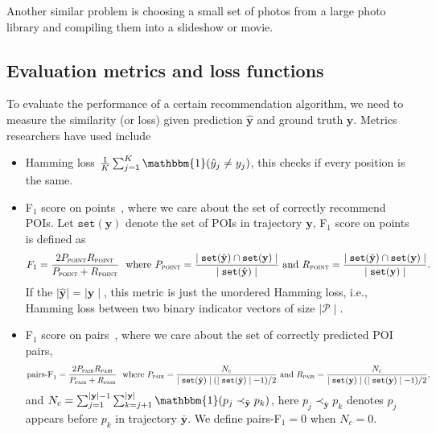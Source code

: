 Another similar problem is choosing a small set of photos from a large photo library and compiling them into a slideshow or movie.



\subsection{Evaluation metrics and loss functions}
\label{sec:evaluation}

To evaluate the performance of a certain recommendation algorithm,
we need to measure the similarity (or loss) given prediction $\hat{\mathbf{y}}$ and ground truth $\mathbf{y}$.
Metrics researchers have used include
\begin{itemize}
\item Hamming loss $\frac{1}{K} \sum_{j=1}^K \mathbbm{1}(\hat{y}_j \neq y_j)$, this checks if every position is the same.

\item F$_1$ score on points~\cite{ijcai15}, where we care about the set of correctly recommend POIs. 
      Let $\texttt{set}(\mathbf{y})$ denote the set of POIs in trajectory $\mathbf{y}$, F$_1$ score on points is defined as
\begin{equation*}
F_1 = \frac{2  P_{\textsc{point}}  R_{\textsc{point}}}{P_{\textsc{point}} + R_{\textsc{point}}} ~~\text{where}~
P_{\textsc{point}} = \frac{\mid \texttt{set}(\hat{\mathbf{y}}) \cap \texttt{set}(\mathbf{y}) \mid}{\mid \texttt{set}(\hat{\mathbf{y}}) \mid}~\text{and}~
R_{\textsc{point}} = \frac{\mid \texttt{set}(\hat{\mathbf{y}}) \cap \texttt{set}(\mathbf{y}) \mid}{\mid \texttt{set}(\mathbf{y}) \mid}.
\end{equation*}
If the $\mid\!\! \hat{\mathbf{y}} \!\!\mid = \mid\!\! \mathbf{y} \!\!\mid$, this metric is just the unordered Hamming loss, 
i.e., Hamming loss between two binary indicator vectors of size $\mid\!\! \mathcal{P} \!\!\mid$.


\item F$_1$ score on pairs~\cite{cikm16paper}, where we care about the set of correctly predicted POI pairs,
\begin{equation*}
\text{pairs-F}_1 = \frac{2 P_{\textsc{pair}} R_{\textsc{pair}}}{P_{\textsc{pair}} + R_{\textsc{pair}}}~~\text{where}~
P_{\textsc{pair}} = \frac{N_c} {\mid \texttt{set}(\hat{\mathbf{y}}) \mid (\mid \texttt{set}(\hat{\mathbf{y}}) \mid - 1) / 2}~\text{and}~
R_{\textsc{pair}} = \frac{N_c} {\mid \texttt{set}(\mathbf{y}) \mid (\mid \texttt{set}(\mathbf{y}) \mid - 1) / 2},
\end{equation*}
and $N_c = \sum_{j=1}^{\mid \mathbf{y} \mid - 1} \sum_{k=j+1}^{\mid \mathbf{y} \mid} \mathbbm{1}(p_j \prec_{\bar{\mathbf{y}}} p_k)$,
here $p_j \prec_{\bar{\mathbf{y}}} p_k$ denotes $p_j$ appears before $p_k$ in trajectory $\bar{\mathbf{y}}$.
We define pairs-F$_1 = 0$ when $N_c = 0$.

\end{itemize}

